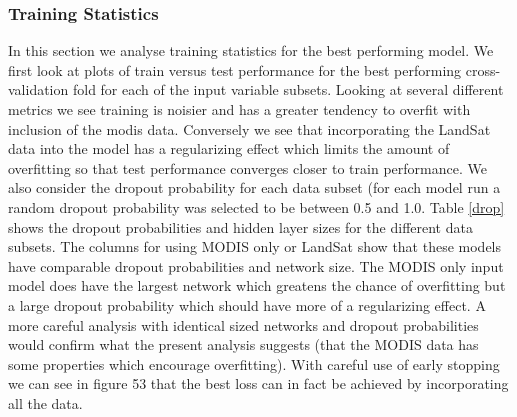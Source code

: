 \def\year{2017}\relax \documentclass[letterpaper]{article}
\begin{document}

\subsubsection{Training Statistics}
In this section we analyse training statistics for the best performing model. We first look at plots of train versus test performance for the best performing cross-validation fold for each of the input variable subsets. Looking at several different metrics we see training is noisier and has a greater tendency to overfit with inclusion of the modis data. Conversely we see that incorporating the LandSat data into the model has a regularizing effect which limits the amount of overfitting so that test performance converges closer to train performance. We also consider the dropout probability for each data subset (for each model run a random dropout probability was selected to be between 0.5 and 1.0. Table \ref{drop} shows the dropout probabilities and hidden layer sizes for the different data subsets. The columns for using MODIS only or LandSat show that these models have comparable dropout probabilities and network size. The MODIS only input model does have the largest network which greatens the chance of overfitting but a large dropout probability which should have more of a regularizing effect. A more careful analysis with identical sized networks and dropout probabilities would confirm what the present analysis suggests (that the MODIS data has some properties which encourage overfitting). With careful use of early stopping we can see in figure 53 that the best loss  can in fact be achieved by incorporating all the data. 
\end{document}
